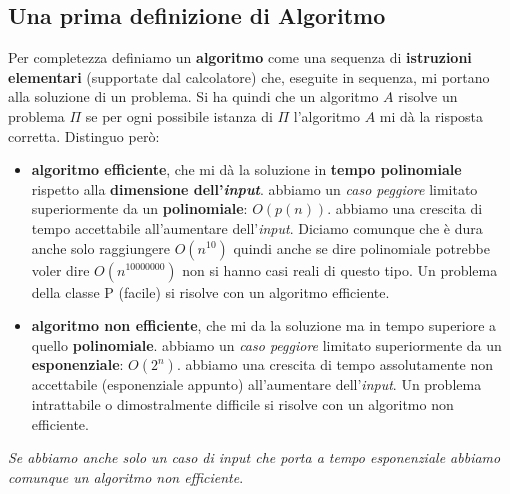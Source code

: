 \subsection{Una prima definizione di Algoritmo}
Per completezza definiamo un \textbf{algoritmo} come una sequenza di
\textbf{istruzioni elementari} (supportate dal calcolatore) che, eseguite in
sequenza, mi portano alla soluzione di un problema. Si ha quindi che un
algoritmo $A$ risolve un problema $\Pi$ se per ogni possibile istanza di $\Pi$
l'algoritmo $A$ mi dà la risposta corretta. Distinguo però:
\begin{itemize}
	\item \textbf{algoritmo efficiente}, che mi dà la soluzione in \textbf{tempo
	      polinomiale} rispetto alla \textbf{dimensione dell'\textit{input}}. abbiamo un
	\textit{caso peggiore} limitato superiormente da un \textbf{polinomiale}:
	$O(p(n))$. abbiamo una crescita di tempo accettabile all'aumentare
	dell'\textit{input}. Diciamo comunque che è dura anche solo raggiungere $O(n^{10})$
	quindi anche se dire polinomiale potrebbe voler dire $O(n^{10000000})$ non si
	hanno casi reali di questo tipo. Un problema della classe P (facile) si risolve con un algoritmo efficiente.
		  
	\item \textbf{algoritmo non efficiente}, che mi da la soluzione ma in tempo
	      superiore a quello \textbf{polinomiale}. abbiamo un \textit{caso peggiore} limitato
	      superiormente da un \textbf{esponenziale}: $O(2^n)$. abbiamo una crescita di tempo
	      assolutamente non accettabile (esponenziale appunto) all'aumentare dell'\textit{input}. Un problema intrattabile o dimostralmente difficile si risolve con un algoritmo non efficiente.
\end{itemize}
\textit{Se abbiamo anche solo un caso di \textit{input} che porta a tempo esponenziale abbiamo
	comunque un algoritmo non efficiente}.\\

